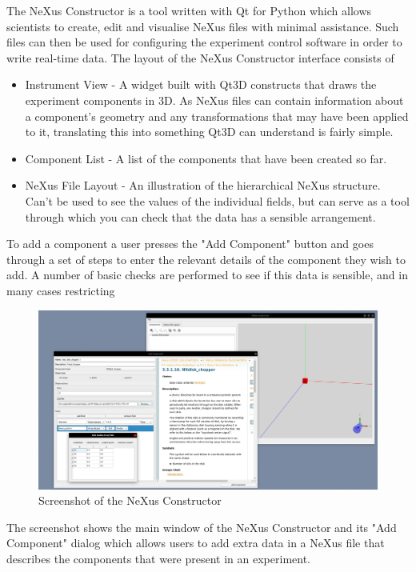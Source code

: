 
The NeXus Constructor is a tool written with Qt for Python which allows scientists to create, edit and visualise NeXus files with minimal assistance. Such files can then be used for configuring the experiment control software in order to write real-time data. The layout of the NeXus Constructor interface consists of 

\begin{itemize}
\item Instrument View - A widget built with Qt3D constructs that draws the experiment components in 3D. As NeXus files can contain information about a component's geometry and any transformations that may have been applied to it, translating this into something Qt3D can understand is fairly simple.
\item Component List - A list of the components that have been created so far. 
\item NeXus File Layout - An illustration of the hierarchical NeXus structure. Can't be used to see the values of the individual fields, but can serve as a tool through which you can check that the data has a sensible arrangement.
\end{itemize} %

To add a component a user presses the "Add Component" button and goes through a set of steps to enter the relevant details of the component they wish to add. A number of basic checks are performed to see if this data is sensible, and in many cases restricting 

\begin{figure}
\caption{Screenshot of the NeXus Constructor}
\includegraphics[width=\linewidth]{screenshot.png}
\end{figure}

The screenshot shows the main window of the NeXus Constructor and its "Add Component" dialog which allows users to add extra data in a NeXus file that describes the components that were present in an experiment.




